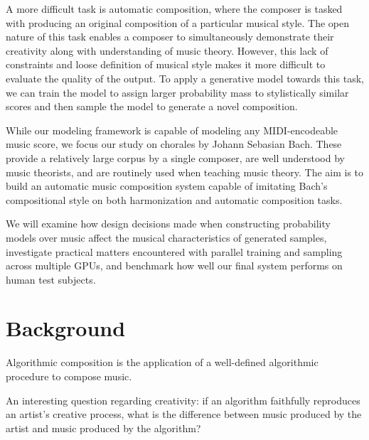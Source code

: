 \documentclass[a4paper,12pt,twoside,openright]{report}
\begin{document}
A more difficult task is automatic composition, where the composer is tasked
with producing an original composition of a particular musical style. The open
nature of this task enables a composer to simultaneously demonstrate their
creativity along with understanding of music theory. However, this lack of
constraints and loose definition of musical style makes it more difficult to
evaluate the quality of the output. To apply a generative model towards this
task, we can train the model to assign larger probability mass to stylistically
similar scores and then sample the model to generate a novel composition.

While our modeling framework is capable of modeling any MIDI-encodeable music
score, we focus our study on chorales by Johann Sebasian Bach. These provide
a relatively large corpus by a single composer, are well understood by music
theorists, and are routinely used when teaching music theory.
The aim is to build an automatic music composition system capable of imitating
Bach's compositional style on both harmonization and automatic composition tasks.

We will examine how design decisions made when constructing probability models
over music affect the musical characteristics of generated samples, investigate
practical matters encountered with parallel training and sampling across
multiple GPUs, and benchmark how well our final system performs on human test
subjects.

\chapter{Background}



Algorithmic composition is the application of a well-defined algorithmic
procedure to compose music.

An interesting question regarding creativity: if an algorithm faithfully reproduces
an artist's creative process, what is the difference between music produced by the artist
and music produced by the algorithm?
\end{document}
